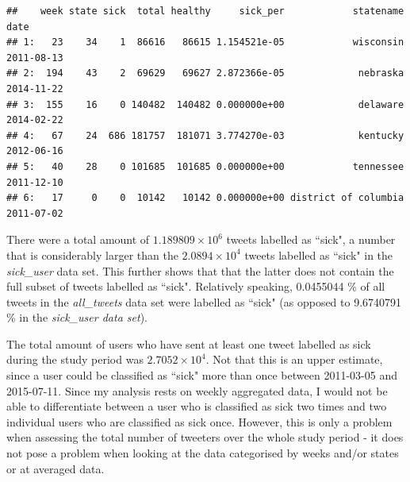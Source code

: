\documentclass[11pt, a4paper,twoside]{report}\usepackage[]{graphicx}\usepackage[]{color}
\makeatletter
\newenvironment{kframe}{%
 \def\at@end@of@kframe{}%
 \ifinner\ifhmode%
  \def\at@end@of@kframe{\end{minipage}}%
  \begin{minipage}{\columnwidth}%
 \fi\fi%
 \def\FrameCommand##1{\hskip\@totalleftmargin \hskip-\fboxsep
 \colorbox{shadecolor}{##1}\hskip-\fboxsep
     \hskip-\linewidth \hskip-\@totalleftmargin \hskip\columnwidth}%
 \MakeFramed {\advance\hsize-\width
   \@totalleftmargin\z@ \linewidth\hsize
   \@setminipage}}%
 {\par\unskip\endMakeFramed%
 \at@end@of@kframe}
\newenvironment{knitrout}{}{} %
\makeatother
\begin{document}
\begin{knitrout}
\color{fgcolor}\begin{kframe}
\begin{verbatim}
##    week state sick  total healthy     sick_per            statename       date
## 1:   23    34    1  86616   86615 1.154521e-05            wisconsin 2011-08-13
## 2:  194    43    2  69629   69627 2.872366e-05             nebraska 2014-11-22
## 3:  155    16    0 140482  140482 0.000000e+00             delaware 2014-02-22
## 4:   67    24  686 181757  181071 3.774270e-03             kentucky 2012-06-16
## 5:   40    28    0 101685  101685 0.000000e+00            tennessee 2011-12-10
## 6:   17     0    0  10142   10142 0.000000e+00 district of columbia 2011-07-02
\end{verbatim}
\end{kframe}
\end{knitrout}

There were a total amount of \ensuremath{1.189809\times 10^{6}} tweets labelled as ``sick", a number that is considerably larger than the \ensuremath{2.0894\times 10^{4}} tweets labelled as ``sick" in the \textit{sick\_user} data set. This further shows that that the latter does not contain the full subset of tweets labelled as ``sick". Relatively speaking, 0.0455044 \% of all tweets in the \textit{all\_tweets} data set were labelled as ``sick" (as opposed to 9.6740791 \% in the \textit{sick\_user data set}).\newline

The total amount of users who have sent at least one tweet labelled as sick during the study period was \ensuremath{2.7052\times 10^{4}}. Not that this is an upper estimate, since a user could be classified as ``sick" more than once between 2011-03-05 and 2015-07-11. Since my analysis rests on weekly aggregated data, I would not be able to differentiate between a user who is classified as sick two times and two individual users who are classified as sick once. However, this is only a problem when assessing the total number of tweeters over the whole study period - it does not pose a problem when looking at the data categorised by weeks and/or states or at averaged data.\newline
\end{document}
